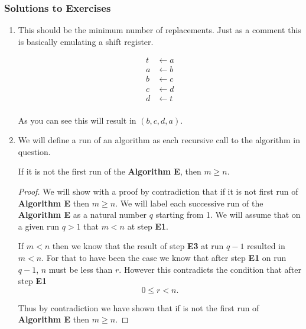 \documentclass[../../main.tex]{subfiles}
\begin{document}
  \subsubsection{Solutions to Exercises}
    \begin{enumerate}
      \item This should be the minimum number of replacements. Just as a comment this
      is basically emulating a shift register.

        \begin{equation*}
          \begin{split}
            t &\leftarrow a\\
            a &\leftarrow b\\
            b &\leftarrow c\\
            c &\leftarrow d\\
            d &\leftarrow t\\
          \end{split}
        \end{equation*}

        As you can see this will result in $(b,c,d,a)$.

      \item We will define a run of an algorithm as each recursive call to the algorithm in question.

      \begin{theorem}
        If it is not the first run of the \textbf{Algorithm E}, then $m \geq n$.
      \end{theorem}

      \begin{proof}
        We will show with a proof by contradiction that if it is not first run of \textbf{Algorithm E}
        then $m \geq n$. We will label each successive run of the \textbf{Algorithm E} as a natural number
        $q$ starting from 1. We will assume that on a given run $q > 1$ that $m < n$ at step \textbf{E1}.

        \par If $m < n$ then we know that the result of step \textbf{E3} at run $q-1$ resulted in $m < n$. For that
        to have been the case we know that after step \textbf{E1} on run $q-1$, $n$ must be less than $r$. However
        this contradicts the condition that after step \textbf{E1}
        \begin{equation*}
          0 \leq r < n.
        \end{equation*}

        Thus by contradiction we have shown that if is not the first run of \textbf{Algorithm E} then $m \geq n$.
      \end{proof}
    \end{enumerate}
\end{document}
